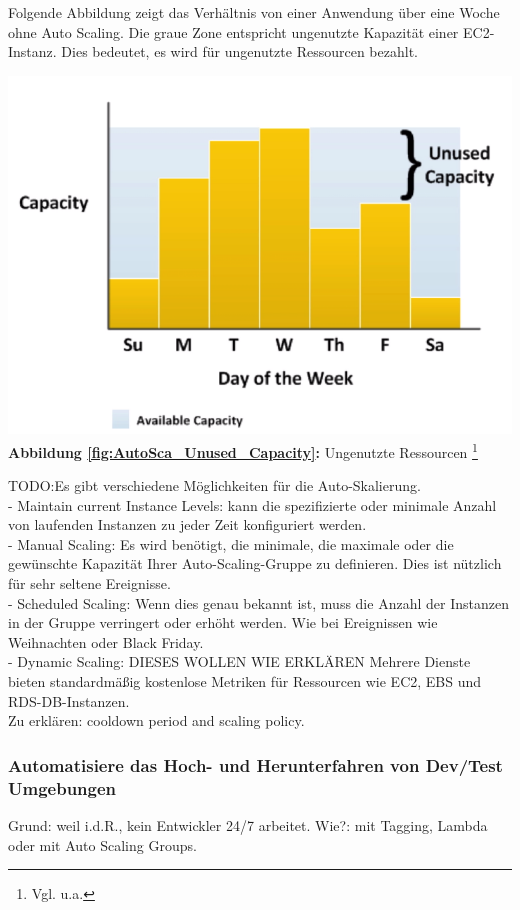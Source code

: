 Folgende Abbildung zeigt das Verhältnis von einer Anwendung über eine Woche ohne Auto Scaling.
Die graue Zone entspricht ungenutzte Kapazität einer EC2-Instanz. Dies bedeutet, es wird für ungenutzte Ressourcen bezahlt.
\begin{center}
    \includegraphics[scale=0.7]{sources/AutoCap Unused Capacity}\label{fig:AutoSca_Unused_Capacity}\\
    \textbf{Abbildung \autoref{fig:AutoSca_Unused_Capacity}:} Ungenutzte Ressourcen
    \footnote{Vgl. u.a.\cite{AMZ01}}
\end{center}
TODO:Es gibt verschiedene Möglichkeiten für die Auto-Skalierung.
\\
- Maintain current Instance Levels: kann die spezifizierte oder minimale Anzahl von laufenden Instanzen zu jeder Zeit konfiguriert werden.
\\
- Manual Scaling: Es wird benötigt, die minimale, die maximale oder die gewünschte Kapazität Ihrer Auto-Scaling-Gruppe zu definieren. Dies ist nützlich für sehr seltene Ereignisse. 
\\
- Scheduled Scaling: Wenn dies genau bekannt ist, muss die Anzahl der Instanzen in der Gruppe verringert oder erhöht werden. Wie bei Ereignissen wie Weihnachten oder Black Friday.
\\
- Dynamic Scaling: DIESES WOLLEN WIE ERKLÄREN
Mehrere Dienste bieten standardmäßig kostenlose Metriken für Ressourcen wie EC2, EBS und RDS-DB-Instanzen.
\\
Zu erklären: cooldown period and scaling policy.


\subsubsection{Automatisiere das Hoch- und Herunterfahren von Dev/Test Umgebungen}
Grund: weil i.d.R., kein Entwickler 24/7 arbeitet.
Wie?: mit Tagging, Lambda oder mit Auto Scaling Groups.

